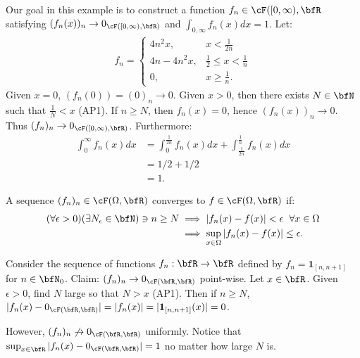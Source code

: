     \begin{example}
        Our goal in this example is to construct a function $f_n \in \cF([0,\infty),\bfR$ satisfying $(f_n(x))_n \rightarrow 0_{\cF([0,\infty),\bfR)}$ and $\int_{0,\infty}f_n(x)dx = 1$. Let:
            \begin{equation*}
            \begin{split}
                f_n = \begin{cases} 4n^2x , & x < \frac{1}{2n}\\ 4n-4n^2x, & \frac{1}{2} \leq x < \frac{1}{n} \\ 0, & x \geq \frac{1}{n}. \end{cases}
            \end{split}
            \end{equation*}
        Given $x = 0$, $(f_n(0)) = (0)_n \rightarrow 0$. Given $x > 0$, then there exists $N \in \bfN$ such that $\frac{1}{N} < x$ (AP1). If $n \geq N$, then $f_n(x) = 0$, hence $(f_n(x))_n \rightarrow 0$. Thus $(f_n)_n \rightarrow 0_{\cF([0,\infty),\bfR)}$. Furthermore:
            \begin{equation*}
            \begin{split}
                \int_0 ^\infty f_n(x)dx &= \int_0^\frac{1}{2n}f_n(x)dx + \int_\frac{1}{2n}^\frac{1}{n}f_n(x)dx \\
                & = 1/2 + 1/2 \\
                & = 1.
            \end{split}
            \end{equation*}
    \end{example}

    \begin{definition}
        A sequence $(f_n)_n \in \cF(\Omega,\bfR)$ converges  to $f \in \cF(\Omega,\bfR)$ if:
            \begin{equation*}
            \begin{split}
                (\forall \epsilon > 0)(\exists N_\epsilon \in \bfN) \ni n \geq N &\implies |f_n(x) - f(x)| < \epsilon \hspace{6pt}\forall x \in \Omega \\
                & \implies \sup_{x \in \Omega}|f_n(x) - f(x)| \leq \epsilon.
            \end{split}
            \end{equation*}
    \end{definition}

    \begin{example}
        Consider the sequence of functions $f_n: \bfR \rightarrow \bfR$ defined by $f_n = \mathbf{1}_{[n,n+1]}$ for $n \in \bfN_0$. Claim: $(f_n)_n \rightarrow 0_{\cF(\bfR,\bfR)}$ point-wise. Let $x \in \bfR$. Given $\epsilon > 0$, find $N$ large so that $N > x$ (AP1). Then if $n \geq N$, $|f_n(x) - 0_{\cF(\bfR,\bfR)}| = |f_n(x)| = |\mathbf{1}_{[n,n+1]}(x)| = 0$.

        However, $(f_n)_n \not\rightarrow 0_{\cF(\bfR,\bfR)}$ uniformly. Notice that $\sup_{x \in \bfR}|f_n(x) - 0_{\cF(\bfR,\bfR)}| = 1$ no matter how large $N$ is.
    \end{example}

